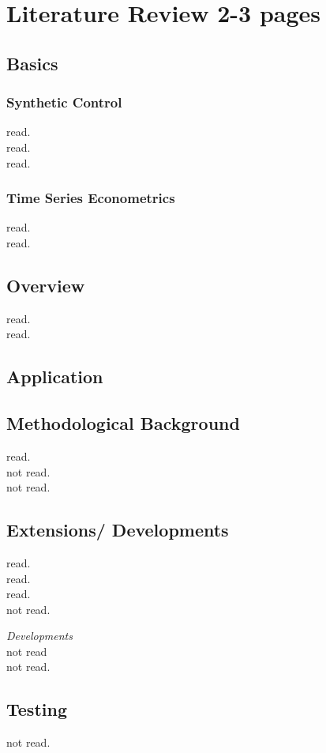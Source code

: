 \section{Literature Review 2-3 pages}
\subsection{Basics}
\subsubsection{Synthetic Control}
\cite{abadie:2003} read.\\
\cite{abadie:2007} read.\\
\cite{abadie:2015} read.

\subsubsection{Time Series Econometrics}
\cite{martin:2012} read.\\
\cite{harvey:2020} read.

\subsection{Overview}
\cite{abadie:2021a} read.\\
\cite{athey:2016} read.

\subsection{Application}
\subsection{Methodological Background}
\cite{abadie:2011} read.\\
\cite{abadie:2006} not read.\\
\cite{abadie:2002} not read.

\subsection{Extensions/ Developments}
\cite{abadie:2019} read.\\
\cite{amjad:2018} read.\\
\cite{benmichael:2021a} read.\\
\cite{benmichael:2021b} not read.

\textit{Developments}\\
\cite{arkhangelsky:2021} not read\\
\cite{athey:2017} not read.


\subsection{Testing}
\cite{andrews:2003} not read.